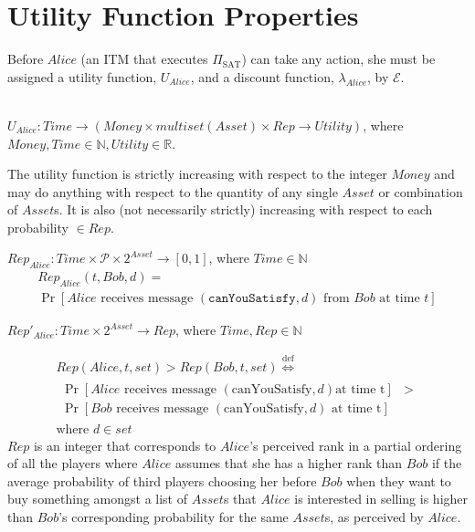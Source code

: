 \section{Utility Function Properties}
  Before $Alice$ (an ITM that executes $\Pi_{\mathrm{SAT}}$) can take any action, she must
  be assigned a utility function, $U_{Alice}$, and a discount function, $\lambda_{Alice}$,
  by $\mathcal{E}$.
  \begin{definition} \ \\
    $U_{Alice} : Time \rightarrow \left(Money \times multiset\left(Asset\right) \times Rep
    \rightarrow Utility\right)$, where $Money, Time \in \mathbb{N}, Utility \in \mathbb{R}$.
  \end{definition}
  The utility function is strictly increasing with respect to the integer $Money$ and may
  do anything with respect to the quantity of any single $Asset$ or combination of
  $Asset$s. It is also (not necessarily strictly) increasing with respect to each
  probability $\in Rep$.

  \begin{definition}
    $Rep_{Alice} : Time \times \mathcal{P} \times 2^{Asset} \rightarrow \left[0,
    1\right]$, where $Time \in \mathbb{N}$
    \begin{gather*}
      Rep_{Alice}\left(t, Bob, d\right) = \\
      \Pr\left[Alice \mbox{ receives message } \left(\mathtt{canYouSatisfy}, d\right)
      \mbox{ from } Bob \mbox{ at time } t\right]
    \end{gather*}
  \end{definition}

  \begin{definition}
    $Rep'_{Alice} : Time \times 2^{Asset} \rightarrow Rep$, where $Time,
    Rep \in \mathbb{N}$
  \end{definition}
  \begin{gather*}
    Rep\left(Alice, t, set\right) > Rep\left(Bob, t, set\right)
    \overset{\mathrm{def}}{\iff} \\
    \begin{aligned}
      \Pr\left[Alice \mbox{ receives message } \left(\mbox{canYouSatisfy}, d\right) \mbox{
      at time t}\right] &> \\
      \Pr\left[Bob \mbox{ receives message } \left(\mbox{canYouSatisfy}, d\right) \mbox{ at
      time t}\right] &
    \end{aligned} \\
    \mbox{where } d \in set
  \end{gather*}
  $Rep$ is an integer that corresponds to $Alice$'s perceived rank in a partial ordering
  of all the players where $Alice$ assumes that she has a higher rank than $Bob$ if the
  average probability of third players choosing her before $Bob$ when they want to buy
  something amongst a list of $Asset$s that $Alice$ is interested in selling is higher
  than $Bob$'s corresponding probability for the same $Asset$s, as perceived by $Alice$.


